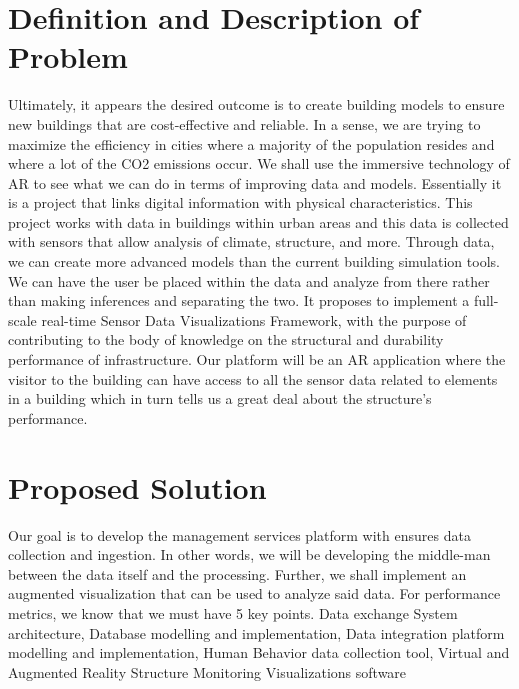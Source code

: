 \documentclass[onecolumn, draftclsnofoot,10pt, compsoc]{IEEEtran}
\begin{document}
\section{Definition and Description of Problem}
Ultimately, it appears the desired outcome is to create building models to ensure new buildings that are cost-effective and reliable. In a sense, we are trying to maximize the efficiency in cities where a majority of the population resides and where a lot of the CO2 emissions occur. We shall use the immersive technology of AR to see what we can do in terms of improving data and models. Essentially it is a project that links digital information with physical characteristics. 
	This project works with data in buildings within urban areas and this data is collected with sensors that allow analysis of climate, structure, and more. Through data, we can create more advanced models than the current building simulation tools. We can have the user be placed within the data and analyze from there rather than making inferences and separating the two. It proposes to implement a full-scale real-time Sensor Data Visualizations Framework, with the purpose of contributing to the body of knowledge on the structural and durability performance of infrastructure. Our platform will be an AR application where the visitor to the building can have access to all the sensor data related to elements in a building which in turn tells us a great deal about the structure’s performance. 

	

\section{Proposed Solution}
Our goal is to develop the management services platform with ensures data collection and ingestion. In other words, we will be developing the middle-man between the data itself and the processing. Further, we shall implement an augmented visualization that can be used to analyze said data. 
	For performance metrics, we know that we must have 5 key points. Data exchange System architecture, Database modelling and implementation, Data integration platform modelling and implementation, Human Behavior data collection tool, Virtual and Augmented Reality Structure Monitoring Visualizations software

	
\end{document}
